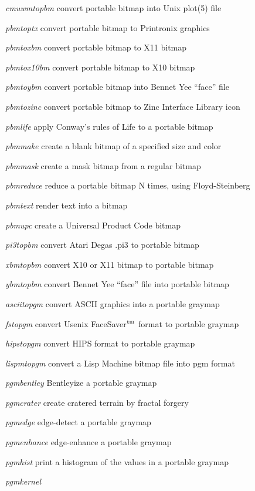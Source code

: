 \begin{TPlist}{{\it cmuwmtopbm}}
convert portable bitmap into Unix plot(5) file
\item[{{\it pbmtoptx}}]
convert portable bitmap to Printronix graphics
\item[{{\it pbmtoxbm}}]
convert portable bitmap to X11 bitmap
\item[{{\it pbmtox10bm}}]
convert portable bitmap to X10 bitmap
\item[{{\it pbmtoybm}}]
convert portable bitmap into Bennet Yee ``face'' file
\item[{{\it pbmtozinc}}]
convert portable bitmap to Zinc Interface Library icon
\item[{{\it pbmlife}}]
apply Conway's rules of Life to a portable bitmap
\item[{{\it pbmmake}}]
create a blank bitmap of a specified size and color
\item[{{\it pbmmask}}]
create a mask bitmap from a regular bitmap
\item[{{\it pbmreduce}}]
reduce a portable bitmap N times, using Floyd-Steinberg
\item[{{\it pbmtext}}]
render text into a bitmap
\item[{{\it pbmupc}}]
create a Universal Product Code bitmap
\item[{{\it pi3topbm}}]
convert Atari Degas .pi3 to portable bitmap
\item[{{\it xbmtopbm}}]
convert X10 or X11 bitmap to portable bitmap
\item[{{\it ybmtopbm}}]
convert Bennet Yee ``face'' file into portable bitmap
\item[{{\it asciitopgm}}]
convert ASCII graphics into a portable graymap
\item[{{\it fstopgm}}]
convert Usenix FaceSaver$^{\rm tm}$ format to portable graymap
\item[{{\it hipstopgm}}]
convert HIPS format to portable graymap
\item[{{\it lispmtopgm}}]
convert a Lisp Machine bitmap file into pgm format
\item[{{\it pgmbentley}}]
Bentleyize a portable graymap
\item[{{\it pgmcrater}}]
create cratered terrain by fractal forgery
\item[{{\it pgmedge}}]
edge-detect a portable graymap
\item[{{\it pgmenhance}}]
edge-enhance a portable graymap
\item[{{\it pgmhist}}]
print a histogram of the values in a portable graymap
\item[{{\it pgmkernel}}]

\end{TPlist}
